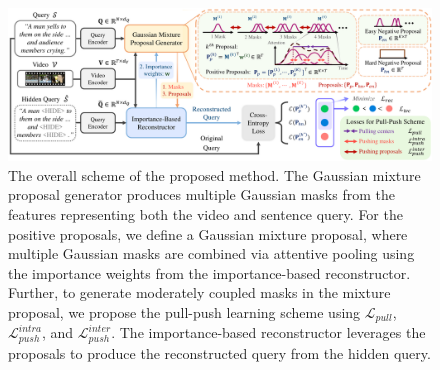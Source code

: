 \begin{figure}[t!]
  \centering
  \includegraphics[width=\linewidth]{figures/1-framework.pdf}
  \caption{
  The overall scheme of the proposed method.
  The Gaussian mixture proposal generator produces multiple Gaussian masks from the features representing both the video and sentence query.
  For the positive proposals, we define a Gaussian mixture proposal, where multiple Gaussian masks are combined via attentive pooling using the importance weights from the importance-based reconstructor.
  Further, to generate moderately coupled masks in the mixture proposal,
  we propose the pull-push learning scheme using $\mathcal{L}_{pull}$, $\mathcal{L}^{intra}_{push}$, and $\mathcal{L}^{inter}_{push}$.
  The importance-based reconstructor leverages the proposals to produce the reconstructed query from the hidden query. 
  }
\label{fig:framework}
\end{figure}


